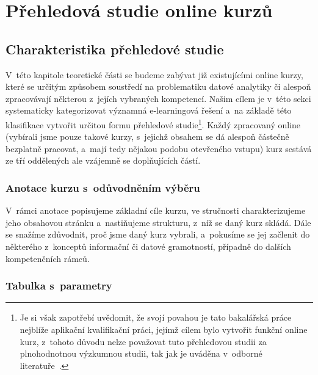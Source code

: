 \hypertarget{pux159ehledovuxe1-studie-online-kurzux16f}{%
\chapter{Přehledová studie online kurzů}\label{pux159ehledovuxe1-studie-online-kurzux16f}}

\hypertarget{charakteristika-pux159ehledovuxe9-studie}{%
\section{Charakteristika přehledové studie}\label{charakteristika-pux159ehledovuxe9-studie}}

V~této kapitole teoretické části se budeme zabývat již existujícími online kurzy, které se určitým způsobem soustředí na problematiku datové analytiky či alespoň zpracovávají některou z~jejích vybraných kompetencí. Našim cílem je v~této sekci systematicky kategorizovat významná e-learningová řešení a~na základě této klasifikace vytvořit určitou formu přehledové studie\footnote{Je si však zapotřebí uvědomit, že svojí povahou je tato bakalářská práce nejblíže aplikační kvalifikační práci, jejímž cílem bylo vytvořit funkční online kurz, z~tohoto důvodu nelze považovat tuto přehledovou studii za plnohodnotnou výzkumnou studii, tak jak je uváděna v~odborné literatuře~\parencite{mares2013}.}. Každý zpracovaný online (vybírali jsme pouze takové kurzy, s~jejichž obsahem se dá alespoň částečně bezplatně pracovat, a~mají tedy nějakou podobu otevřeného vstupu) kurz sestává ze tří oddělených ale vzájemně se doplňujících částí.

\hypertarget{anotace-kurzu-s-odux16fvodnux11bnuxedm-vuxfdbux11bru}{%
\subsection{Anotace kurzu s~odůvodněním výběru}\label{anotace-kurzu-s-odux16fvodnux11bnuxedm-vuxfdbux11bru}}

V~rámci anotace popisujeme základní cíle kurzu, ve stručnosti charakterizujeme jeho obsahovou stránku a~nastiňujeme strukturu, z~níž se daný kurz skládá. Dále se snažíme zdůvodnit, proč jsme daný kurz vybrali, a~pokusíme se jej začlenit do některého z~konceptů informační či datové gramotností, případně do dalších kompetenčních rámců.

\hypertarget{tabulka-s-parametry}{%
\subsection{Tabulka s~parametry}\label{tabulka-s-parametry}}

